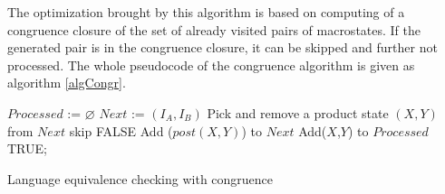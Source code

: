The optimization brought by this algorithm is based on computing of a congruence closure of the set of already visited pairs of macrostates. 
If the generated pair is in the congruence closure, it can be skipped and further not processed.
	The whole pseudocode of the congruence algorithm is given as algorithm \ref{algCongr}.

	\begin{algorithm}[h]
		\label{algCongr}
			$Processed$ := $\varnothing$\;
			$Next$ := $(I_A,I_B)$\;
			{
				Pick and remove a product state $(X,Y)$ from $Next$\;
				{skip\;}
				{
					\Return FALSE\;
				}
					Add ($post(X,Y)$) to $Next$\;
				Add($X$,$Y$) to $Processed$\;
			}
			\Return TRUE;
		\caption{Language equivalence checking with congruence}
\end{algorithm}

